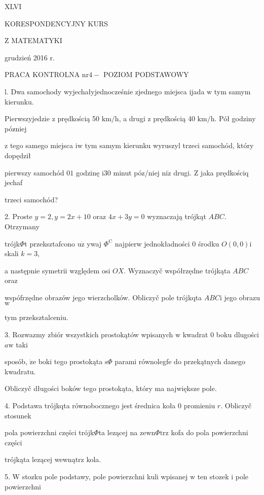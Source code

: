 \documentclass[a4paper,12pt]{article}
\begin{document}
XLVI

KORESPONDENCYJNY KURS

Z MATEMATYKI

grudzień 2016 r.

PRACA KONTROLNA $\mathrm{n}\mathrm{r} 4-$ POZIOM PODSTAWOWY

l. Dwa samochody wyjechałyjednocześnie zjednego miejsca ijada $\mathrm{w}$ tym samym kierunku.

Pierwszyjedzie $\mathrm{z}$ prędkością 50 $\mathrm{k}\mathrm{m}/\mathrm{h}$, a drugi $\mathrm{z}$ prędkością 40 $\mathrm{k}\mathrm{m}/\mathrm{h}$. Pół godziny póz$\acute{}$niej

$\mathrm{z}$ tego samego miejsca $\mathrm{i}\mathrm{w}$ tym samym kierunku wyruszyl trzeci samochód, który dopędził

pierwszy samochód $0 1$ godzinę $\mathrm{i}30$ minut póz/niej $\mathrm{n}\mathrm{i}\dot{\mathrm{z}}$ drugi. $\mathrm{Z}$ jaka prędkościq jechaf

trzeci samochód?

2. Proste $y = 2, y = 2x+10$ oraz $4x+3y = 0$ wyznaczają trójkąt $ABC$. Otrzymany

trójk$\Phi$t przeksztafcono $\mathrm{u}\dot{\mathrm{z}}$ ywaj $\Phi^{\mathrm{C}}$ najpierw jednokładności $0$ środku $O(0,0)\mathrm{i}$ skali $k=3,$

a następnie symetrii względem osi $OX$. Wyznaczyč współrzędne trójkąta $ABC$ oraz

wspófrzędne obrazów jego wierzcholków. Obliczyč pole trójkqta $ABC\mathrm{i}$ jego obrazu $\mathrm{w}$

tym przeksztalceniu.

3. Rozwazmy zbiór wszystkich prostokątów wpisanych $\mathrm{w}$ kwadrat $0$ boku dlugości $a\mathrm{w}$ taki

sposób, $\dot{\mathrm{z}}\mathrm{e}$ boki tego prostokąta $\mathrm{s}\Phi$ parami równolegfe do przekątnych danego kwadratu.

Obliczyč długości boków tego prostokąta, który ma największe pole.

4. Podstawa trójkqta równobocznego jest średnica koła $0$ promieniu $r$. Obliczyč stosunek

pola powierzchni części trójk$\Phi$ta lezącej na $\mathrm{z}\mathrm{e}\mathrm{w}\mathrm{n}\Phi \mathrm{t}\mathrm{r}\mathrm{z}$ kofa do pola powierzchni części

trójkąta lezącej wewnątrz kola.

5. $\mathrm{W}$ stozku pole podstawy, pole powierzchni kuli wpisanej $\mathrm{w}$ ten stozek $\mathrm{i}$ pole powierzchni
\end{document}
